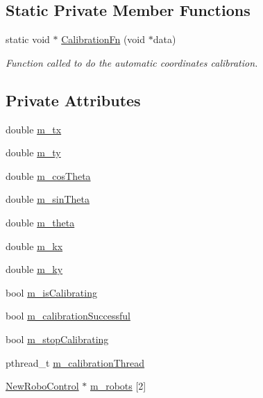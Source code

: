 \subsection*{Static Private Member Functions}
\begin{DoxyCompactItemize}
\item 
static void $\ast$ \hyperlink{classCoordinatesCalibrer_a4ce4c153ae8c3e50faccfba40e6bc4ea}{CalibrationFn} (void $\ast$data)
\begin{DoxyCompactList}\small\item\em Function called to do the automatic coordinates calibration. \item\end{DoxyCompactList}\end{DoxyCompactItemize}
\subsection*{Private Attributes}
\begin{DoxyCompactItemize}
\item 
double \hyperlink{classCoordinatesCalibrer_ad3dcf12acb15253d8467440ccf917581}{m\_\-tx}
\item 
double \hyperlink{classCoordinatesCalibrer_a7e9c56017cf2f279564f2aba38aa146b}{m\_\-ty}
\item 
double \hyperlink{classCoordinatesCalibrer_a0fd71c87e90fc61802942e22c9584fb9}{m\_\-cosTheta}
\item 
double \hyperlink{classCoordinatesCalibrer_af2675b7f9f8612eb53e81a5268501180}{m\_\-sinTheta}
\item 
double \hyperlink{classCoordinatesCalibrer_a039975d1cf826afcb960e77f8f957f91}{m\_\-theta}
\item 
double \hyperlink{classCoordinatesCalibrer_a337af708f5dc1bfca0d191b988d8ab49}{m\_\-kx}
\item 
double \hyperlink{classCoordinatesCalibrer_a10648b2ef70a9ad0fd874e04f3b4d488}{m\_\-ky}
\item 
bool \hyperlink{classCoordinatesCalibrer_a2d3543afab02c87d0e06861d064bd265}{m\_\-isCalibrating}
\item 
bool \hyperlink{classCoordinatesCalibrer_aade3d6c933ebb71c197061828ca6b951}{m\_\-calibrationSuccessful}
\item 
bool \hyperlink{classCoordinatesCalibrer_ac8da80d736936d73e78f21a7f046855d}{m\_\-stopCalibrating}
\item 
pthread\_\-t \hyperlink{classCoordinatesCalibrer_aa2b792c4284dc94338c9acbd26ea2c3a}{m\_\-calibrationThread}
\item 
\hyperlink{classNewRoboControl}{NewRoboControl} $\ast$ \hyperlink{classCoordinatesCalibrer_aebcdb5e598d2af268ab93a0271c245b6}{m\_\-robots} \mbox{[}2\mbox{]}
\end{DoxyCompactItemize}


